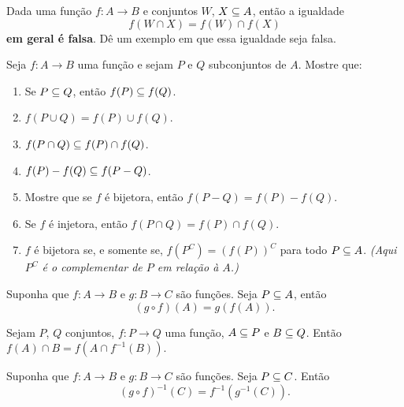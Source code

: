 \documentclass[12pt]{exam}
\begin{document}
    \questao{} Dada uma fun\c{c}\~ao $f : A \to B$ e conjuntos $W$, $X \subseteq A$, ent\~ao a igualdade
    \[
        f(W \cap X) = f(W) \cap f(X)
    \]
    \textbf{em geral \'e falsa}. D\^e um exemplo em que essa igualdade seja falsa.

    \vspace{.3cm}

    \questao{} Seja $f : A \to B$ uma fun\c{c}\~ao e sejam $P$ e $Q$ subconjuntos de $A$. Mostre que:
    \begin{enumerate}[label={\alph*})]
        \item Se $P\subseteq Q$, ent{\~a}o $f(P)\subseteq f(Q)$.
        \item $f(P\cup Q) = f(P)\cup f(Q)$.

        \item $f(P\cap Q)\subseteq f(P)\cap f(Q)$.

        \item $f(P) - f(Q) \subseteq f(P - Q)$.

        \item Mostre que se $f$ é bijetora, então $f(P - Q) = f(P) - f(Q)$.

        \item Se $f$ {\'e} injetora, ent{\~a}o $f(P\cap Q) =  f(P)\cap f(Q)$.

        \item $f$ {\'e} bijetora se, e somente se, $f(P^C) = (f(P))^C$ para todo $P \subseteq A$. \textit{(Aqui $P^C$ \'e o complementar de $P$ em rela\c{c}\~ao \`a $A$.)}
    \end{enumerate}

    \vspace{.3cm}

    \questao{} Suponha que $f : A \to B$ e $g : B \to C$ são funções. Seja $P \subseteq A$, então
    \[
        (g \circ f)(A) = g(f(A)).
    \]

    \vspace{.3cm}

    \questao{} Sejam $P$, $Q$ conjuntos, $f : P \to Q$ uma função, $A \subseteq P$ e $B \subseteq Q$. Então $f(A) \cap B = f(A \cap f^{-1}(B))$.

    \vspace{.3cm}

    \questao{} Suponha que $f : A \to B$ e $g : B \to C$ são funções. Seja $P \subseteq C$. Então
    \[
        (g \circ f)^{-1}(C) = f^{-1}(g^{-1}(C)).
    \]
\end{document}
